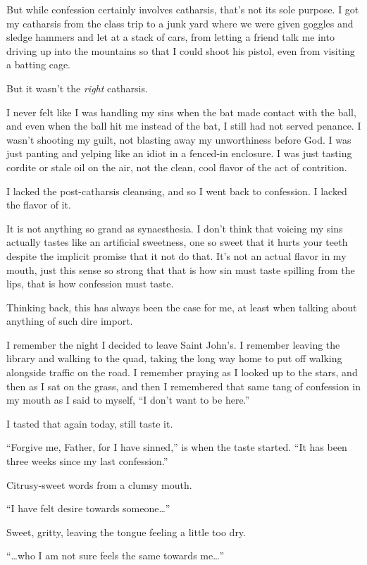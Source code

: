 But while confession certainly involves catharsis, that's not its sole purpose. I got my catharsis from the class trip to a junk yard where we were given goggles and sledge hammers and let at a stack of cars, from letting a friend talk me into driving up into the mountains so that I could shoot his pistol, even from visiting a batting cage.

But it wasn't the \emph{right} catharsis.

I never felt like I was handling my sins when the bat made contact with the ball, and even when the ball hit me instead of the bat, I still had not served penance. I wasn't shooting my guilt, not blasting away my unworthiness before God. I was just panting and yelping like an idiot in a fenced-in enclosure. I was just tasting cordite or stale oil on the air, not the clean, cool flavor of the act of contrition.

I lacked the post-catharsis cleansing, and so I went back to confession. I lacked the flavor of it.

It is not anything so grand as synaesthesia. I don't think that voicing my sins actually tastes like an artificial sweetness, one so sweet that it hurts your teeth despite the implicit promise that it not do that. It's not an actual flavor in my mouth, just this sense so strong that that is how sin must taste spilling from the lips, that is how confession must taste.

Thinking back, this has always been the case for me, at least when talking about anything of such dire import.

I remember the night I decided to leave Saint John's. I remember leaving the library and walking to the quad, taking the long way home to put off walking alongside traffic on the road. I remember praying as I looked up to the stars, and then as I sat on the grass, and then I remembered that same tang of confession in my mouth as I said to myself, ``I don't want to be here.''

I tasted that again today, still taste it.

``Forgive me, Father, for I have sinned,'' is when the taste started. ``It has been three weeks since my last confession.''

Citrusy-sweet words from a clumsy mouth.

``I have felt desire towards someone\ldots{}''

Sweet, gritty, leaving the tongue feeling a little too dry.

``\ldots who I am not sure feels the same towards me\ldots{}''

